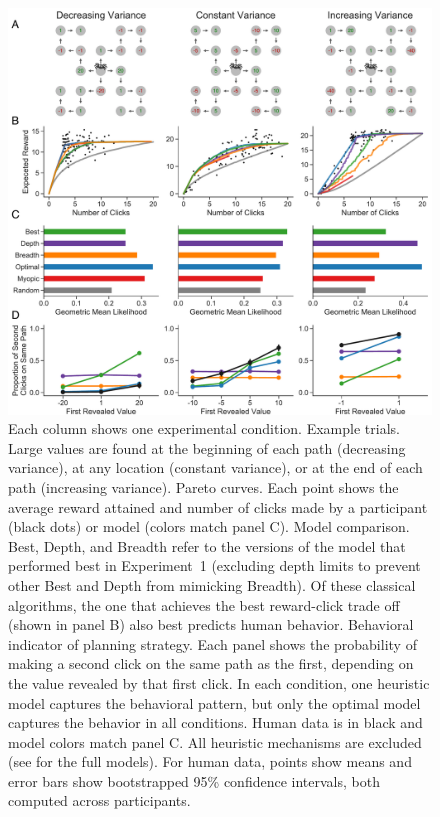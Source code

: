 \begin{figure}[p]
  \centering
  \includegraphics[width=\textwidth]{figs/planning/fig4.pdf}
  \caption{
    Each column shows one experimental condition.
     Example trials. Large values are found at the beginning of each path (decreasing variance), at any location (constant variance), or at the end of each path (increasing variance).
     Pareto curves. Each point shows the average reward attained and number of clicks made by a participant (black dots) or model (colors match panel C). %
     Model comparison. Best, Depth, and Breadth refer to the versions of the model that performed best in Experiment~1 (excluding depth limits to prevent other Best and Depth from mimicking Breadth). Of these classical algorithms, the one that achieves the best reward-click trade off (shown in panel B) also best predicts human behavior.
     Behavioral indicator of planning strategy. Each panel shows the probability of making a second click on the same path as the first, depending on the value revealed by that first click. In each condition, one heuristic model captures the behavioral pattern, but only the optimal model captures the behavior in all conditions.
    Human data is in black and model colors match panel C. All heuristic mechanisms are excluded (see  for the full models). For human data, points show means and error bars show bootstrapped 95\% confidence intervals, both computed across participants.
  }
  \label{fig:planning-exp2}
\end{figure}



